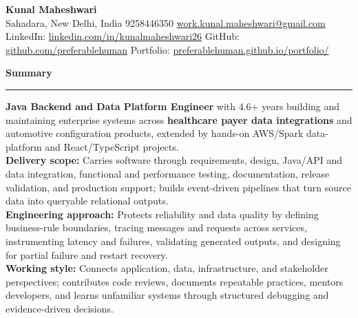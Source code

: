 \documentclass[11pt,letterpaper]{article}
\newcommand{\ressection}[1]{\Needspace{6\baselineskip}\vspace{8pt}\par\textbf{#1}\par\vspace{2pt}\hrule\vspace{5pt}}
\begin{document}
\pagestyle{empty}\raggedright\fontsize{11}{12.5}\selectfont

{\Large \textbf{Kunal Maheshwari}}\\
Sahadara, New Delhi, India \textbar{} 9258446350 \textbar{} \href{mailto:work.kunal.maheshwari@gmail.com}{work.kunal.maheshwari@gmail.com}\\
LinkedIn: \href{https://www.linkedin.com/in/kunalmaheshwari26}{linkedin.com/in/kunalmaheshwari26} \textbar{} GitHub: \href{https://github.com/preferablehuman}{github.com/preferablehuman} \textbar{} Portfolio: \href{https://preferablehuman.github.io/portfolio/}{preferablehuman.github.io/portfolio/}

\ressection{Summary}
\textbf{Java Backend and Data Platform Engineer} with 4.6+ years building and maintaining enterprise systems across \textbf{healthcare payer data integrations} and automotive configuration products, extended by hands-on AWS/Spark data-platform and React/TypeScript projects.\\[2pt]
\textbf{Delivery scope:} Carries software through requirements, design, Java/API and data integration, functional and performance testing, documentation, release validation, and production support; builds event-driven pipelines that turn source data into queryable relational outputs.\\[2pt]
\textbf{Engineering approach:} Protects reliability and data quality by defining business-rule boundaries, tracing messages and requests across services, instrumenting latency and failures, validating generated outputs, and designing for partial failure and restart recovery.\\[2pt]
\textbf{Working style:} Connects application, data, infrastructure, and stakeholder perspectives; contributes code reviews, documents repeatable practices, mentors developers, and learns unfamiliar systems through structured debugging and evidence-driven decisions.
\end{document}

